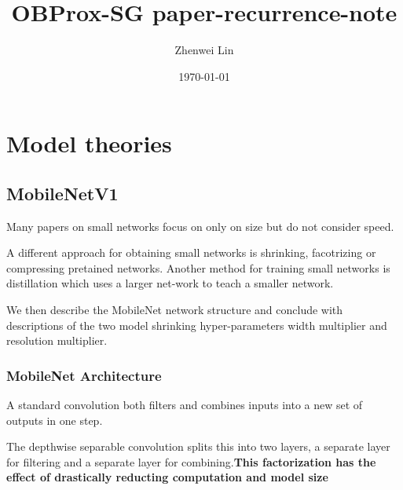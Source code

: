 \documentclass[11pt,en,bibstyle=ieeetr]{elegantpaper}
\title{OBProx-SG paper-recurrence-note}
\author{Zhenwei Lin}
\date{\today}
\begin{document}
\maketitle



\section{Model theories}

\subsection{MobileNetV1}
Many papers on small networks focus on only on size but do not consider speed.

A different approach for obtaining  small networks is shrinking, facotrizing or compressing pretained networks. Another method for training small networks is distillation which uses a larger net-work to teach a smaller network.

We then describe the MobileNet network structure and conclude with descriptions of the two model shrinking hyper-parameters width multiplier and resolution multiplier.
\subsubsection{MobileNet Architecture}

A standard convolution both filters and combines inputs into a new set of outputs in one step.

The depthwise separable convolution splits this into two layers, a separate layer for filtering and a separate layer for combining.\textbf{This factorization has the effect of drastically reducting computation and model size}
\end{document}
